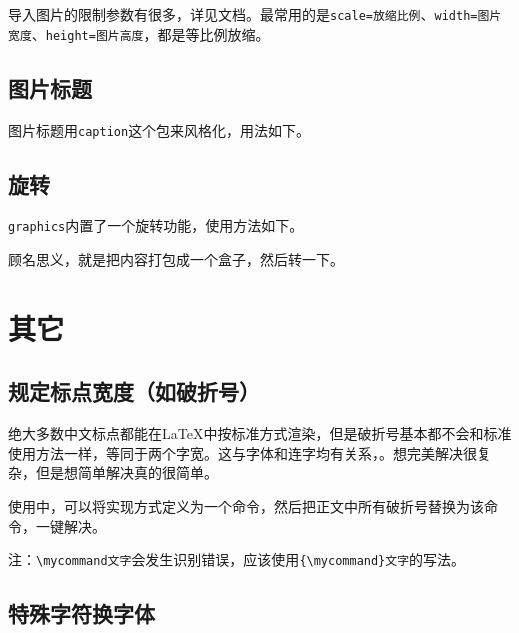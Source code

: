 \documentclass[10pt,openany]{book}
\begin{document}
\begin{sloppypar}
    导入图片的限制参数有很多，详见文档。最常用的是\texttt{scale=放缩比例}、\texttt{width=图片宽度}、\texttt{height=图片高度}，都是等比例放缩。

    \section{图片标题}

    图片标题用\texttt{caption}这个包来风格化，用法如下。

    

    \section{旋转}

    \texttt{graphics}内置了一个旋转功能，使用方法如下。

    

    顾名思义，就是把内容打包成一个盒子，然后转一下。

    \chapter{其它}

    \section[规定标点宽度]{规定标点宽度（如破折号）}
    \label{chsline}

    绝大多数中文标点都能在{\LaTeX}中按标准方式渲染，但是破折号基本都不会和标准使用方法一样，等同于两个字宽。这与字体和连字均有关系，。想完美解决很复杂，但是想简单解决真的很简单。

    

    使用中，可以将实现方式定义为一个命令，然后把正文中所有破折号替换为该命令，一键解决。

    注：\texttt{\textbackslash{}mycommand\hspace{-0.1em}文字}会发生识别错误，应该使用\texttt{\{\textbackslash{}mycommand\}\hspace{-0.1em}文字}的写法。

    \section{特殊字符换字体}


\end{sloppypar}
\end{document}
